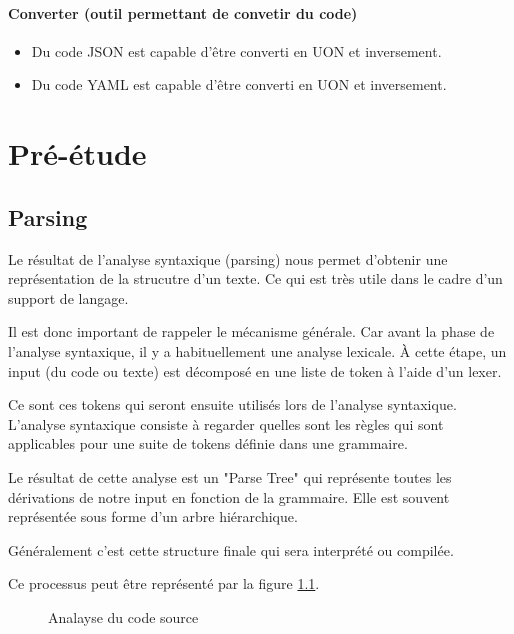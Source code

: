 \documentclass[
    iict, %
    il, %
]{heig-tb}
\begin{document}
\subsubsection*{Converter (outil permettant de convetir du code)}
\begin{itemize}
    \item Du code JSON est capable d’être converti en UON et inversement.
    \item Du code YAML est capable d’être converti en UON et inversement.
\end{itemize}

\chapter{Pré-étude}

\section{Parsing}\label{parsing}

Le résultat de l'analyse syntaxique (parsing) nous permet d'obtenir une représentation de la strucutre d'un texte. Ce qui est très utile dans le cadre d'un support de langage.

Il est donc important de rappeler le mécanisme générale. Car avant la phase de l'analyse syntaxique, il y a habituellement une analyse lexicale.
À cette étape, un input (du code ou texte) est décomposé en une liste de token à l'aide d'un lexer.

Ce sont ces tokens qui seront ensuite utilisés lors de l'analyse syntaxique.
L'analyse syntaxique consiste à regarder quelles sont les règles qui sont applicables pour une suite de tokens définie dans une grammaire.

Le résultat de cette analyse est un "Parse Tree" qui représente toutes les dérivations de notre input en fonction de la grammaire.
Elle est souvent représentée sous forme d'un arbre hiérarchique.

Généralement c'est cette structure finale qui sera interprété ou compilée.

Ce processus peut être représenté par la figure \ref{Analayse du code source}.

\begin{figure}[!h]
    \begin{center}
    \end{center}
    \caption[Analayse du code source]{\label{Analayse du code source} Analayse du code source}
\end{figure}
\end{document}
